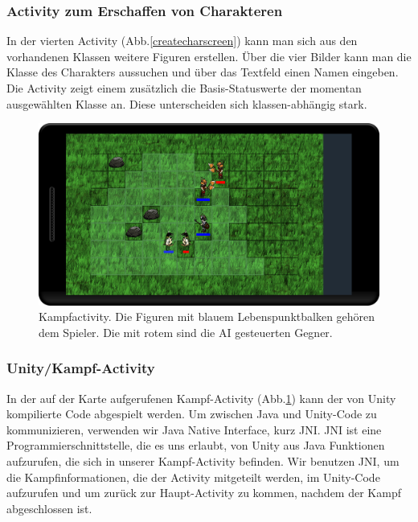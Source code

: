 \documentclass[extern,palatino]{cgBA}
\begin{document}
\subsubsection{Activity zum Erschaffen von Charakteren}
In der vierten Activity (Abb.\ref{createcharscreen}) kann man sich aus den vorhandenen Klassen weitere Figuren erstellen. Über die vier Bilder kann man die Klasse des Charakters aussuchen und über das Textfeld einen Namen eingeben. Die Activity zeigt einem zusätzlich die Basis-Statuswerte der momentan ausgewählten Klasse an. Diese unterscheiden sich klassen-abhängig stark.
\newpage
\begin{figure}[H]
	\centering
	\includegraphics[width=1.0\textwidth]{fightscreen.png}
	\caption{Kampfactivity. Die Figuren mit blauem Lebenspunktbalken gehören dem Spieler. Die mit rotem sind die AI gesteuerten Gegner.}
	\label{fightscreen}
\end{figure}
\subsubsection{Unity/Kampf-Activity}
In der auf der Karte aufgerufenen Kampf-Activity (Abb.\ref{fightscreen}) kann der von Unity kompilierte Code abgespielt werden. Um zwischen Java und Unity-Code zu kommunizieren, verwenden wir Java Native Interface, kurz JNI. JNI ist eine Programmierschnittstelle, die es uns erlaubt, von Unity aus Java Funktionen aufzurufen, die sich in unserer Kampf-Activity befinden. Wir benutzen JNI, um die Kampfinformationen, die der Activity mitgeteilt werden, im Unity-Code aufzurufen und um zurück zur Haupt-Activity zu kommen, nachdem der Kampf abgeschlossen ist.
\newpage
\end{document}
